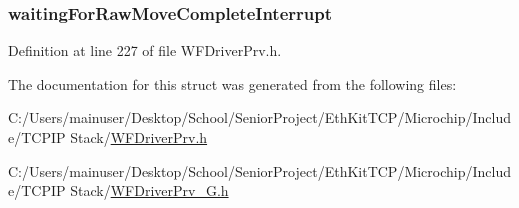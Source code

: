 \subsubsection[{waiting\+For\+Raw\+Move\+Complete\+Interrupt}]{ waiting\+For\+Raw\+Move\+Complete\+Interrupt}\label{structt_raw_move_state_a20b0ee3aee1aa7a07fc9616828a42df2}


Definition at line 227 of file W\+F\+Driver\+Prv.\+h.



The documentation for this struct was generated from the following files\+:\begin{DoxyCompactItemize}
\item 
C\+:/\+Users/mainuser/\+Desktop/\+School/\+Senior\+Project/\+Eth\+Kit\+T\+C\+P/\+Microchip/\+Include/\+T\+C\+P\+I\+P Stack/\hyperlink{_w_f_driver_prv_8h}{W\+F\+Driver\+Prv.\+h}\item 
C\+:/\+Users/mainuser/\+Desktop/\+School/\+Senior\+Project/\+Eth\+Kit\+T\+C\+P/\+Microchip/\+Include/\+T\+C\+P\+I\+P Stack/\hyperlink{_w_f_driver_prv__24_g_8h}{W\+F\+Driver\+Prv\+\_\+G.\+h}\end{DoxyCompactItemize}
